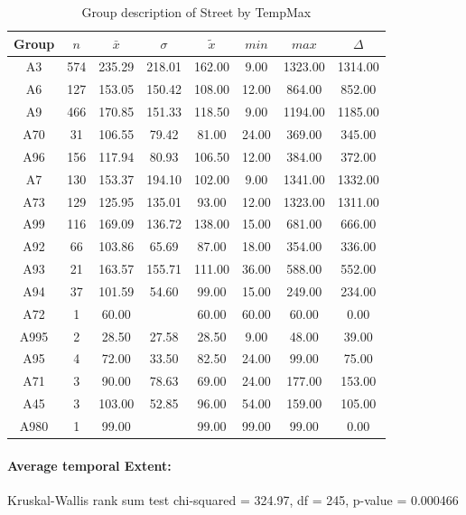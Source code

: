 \begin{table}[ht]
	\tiny
	\centering
	\begin{tabular}{c|c|c|c|c|c|c|c}
		\toprule
		Group & $n$ & $\bar{x}$ & $\sigma$ & $\tilde{x}$ & $min$ & $max$ & $\Delta$ \\ 
		\midrule
		A3 & 574 & 235.29 & 218.01 & 162.00 & 9.00 & 1323.00 & 1314.00   \\ 
		A6 & 127 & 153.05 & 150.42 & 108.00 & 12.00 & 864.00 & 852.00   \\ 
		A9 & 466 & 170.85 & 151.33 & 118.50 & 9.00 & 1194.00 & 1185.00   \\ 
		A70 & 31 & 106.55 & 79.42 & 81.00 & 24.00 & 369.00 & 345.00   \\ 
		A96 & 156 & 117.94 & 80.93 & 106.50 & 12.00 & 384.00 & 372.00   \\ 
		A7 & 130 & 153.37 & 194.10 & 102.00 & 9.00 & 1341.00 & 1332.00  \\ 
		A73 & 129 & 125.95 & 135.01 & 93.00 & 12.00 & 1323.00 & 1311.00  \\ 
		A99 & 116 & 169.09 & 136.72 & 138.00 & 15.00 & 681.00 & 666.00  \\ 
		A92 & 66 & 103.86 & 65.69 & 87.00 & 18.00 & 354.00 & 336.00 \\ 
		A93 & 21 & 163.57 & 155.71 & 111.00 & 36.00 & 588.00 & 552.00   \\ 
		A94 & 37 & 101.59 & 54.60 & 99.00 & 15.00 & 249.00 & 234.00 \\ 
		A72 & 1 & 60.00 &  & 60.00 & 60.00 & 60.00 & 0.00 \\ 
		A995 & 2 & 28.50 & 27.58 & 28.50 & 9.00 & 48.00 & 39.00   \\ 
		A95 & 4 & 72.00 & 33.50 & 82.50 & 24.00 & 99.00 & 75.00  \\ 
		A71 & 3 & 90.00 & 78.63 & 69.00 & 24.00 & 177.00 & 153.00   \\ 
		A45 & 3 & 103.00 & 52.85 & 96.00 & 54.00 & 159.00 & 105.00   \\ 
		A980 & 1 & 99.00 &  & 99.00 & 99.00 & 99.00 & 0.00   \\ 
 		\bottomrule
	\end{tabular}
	\caption{Group description of Street by TempMax}
\end{table}

\paragraph{Average temporal Extent:}
Kruskal-Wallis rank sum test chi-squared = 324.97, df = 245, p-value = 0.000466

